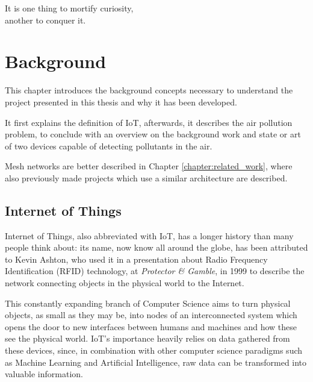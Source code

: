 
\begin{savequote}[70mm]
	It is one thing to mortify curiosity,\\another to conquer it.
\end{savequote}

\chapter{Background}\label{chapter:background}

	This chapter introduces the background concepts necessary to understand the project presented in this thesis and why it has been developed.
	
	It first explains the definition of IoT, afterwards, it describes the air pollution problem, to conclude with an overview on the background work and state or art of two devices capable of detecting pollutants in the air.

	Mesh networks are better described in Chapter \ref{chapter:related_work}, where also previously made projects which use a similar architecture are described.

	\section{Internet of Things}
	
		
		Internet of Things, also abbreviated with IoT, has a longer history than many people think about: its name, now know all around the globe, has been attributed to Kevin Ashton, who used it in a presentation about Radio Frequency Identification (RFID) technology, at \textit{Protector \& Gamble}, in 1999 \cite{iot_definition} to describe the network connecting objects in the physical world to the Internet.
		
		This constantly expanding branch of Computer Science aims to turn physical objects, as small as they may be, into nodes of an interconnected system which opens the door to new interfaces between humans and machines and how these see the physical world.
		IoT's importance heavily relies on data gathered from these devices, since, in combination with other computer science paradigms such as Machine Learning and Artificial Intelligence, raw data can be transformed into valuable information.
	
